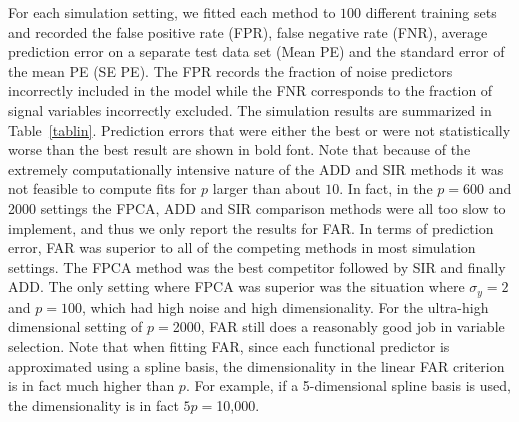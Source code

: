 \documentclass[aos,MSNbibl,dvips]{arximspdf}
\begin{document}
For each simulation setting, we fitted each method to $100$ different
training sets and recorded the false positive rate (FPR), false
negative rate (FNR), average prediction error on a separate test data
set (Mean PE) and the standard error of the mean PE (SE PE). The FPR
records the fraction of noise predictors incorrectly included in the
model while the FNR corresponds to the fraction of signal variables
incorrectly excluded. The simulation results are summarized in
Table~\ref{tablin}. Prediction errors that were either the best or
were not statistically worse than the best result are shown in bold
font. Note that because of the extremely computationally intensive
nature of the ADD and SIR methods it was not feasible to compute fits
for $p$ larger than about $10$. In fact, in the $p=600$ and 2000
settings the FPCA, ADD and SIR comparison methods were all too slow to
implement, and thus we only report the results for FAR. In terms of
prediction error, FAR was superior to all of the competing methods in
most simulation settings. The FPCA method was the best competitor
followed by SIR and finally ADD.
The only setting where FPCA was superior was the situation where
$\sigma_y=2$ and $p=100$, which had high noise and high
dimensionality. For the ultra-high dimensional setting of $p={}$2000,
FAR still does a reasonably good job in variable selection. Note that
when fitting FAR, since each functional predictor is approximated using
a spline basis, the dimensionality in the linear FAR criterion is in
fact much higher than $p$. For example, if a 5-dimensional spline basis
is used, the dimensionality is in fact $5p ={}$10,000.
\end{document}
